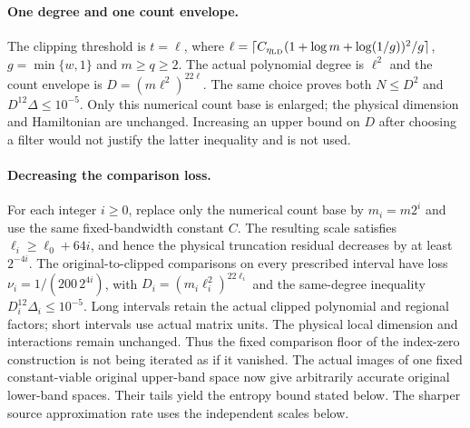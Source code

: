 \documentclass{article}
\begin{document}
\paragraph{One degree and one count envelope.}
The clipping threshold is $t=\ell$, where
$\ell=\lceil C_{\eta_{\rm LD}}(1+\log m+\log(1/g))^2/g\rceil$,
$g=\min\{w,1\}$ and $m\ge q\ge2$.
The actual polynomial degree is $\ell^2$ and the count envelope is
$D=(m\ell^2)^{22\ell}$.
The same choice proves both $N\le D^2$ and $D^{12}\Delta\le10^{-5}$.
Only this numerical count base is enlarged; the physical dimension and
Hamiltonian are unchanged. Increasing an upper bound on $D$ after choosing
a filter would not justify the latter inequality and is not used.

\paragraph{Decreasing the comparison loss.}
For each integer $i\ge0$, replace only the numerical count base by
$m_i=m2^i$ and use the same fixed-bandwidth constant $C$.
The resulting scale satisfies $\ell_i\ge\ell_0+64i$, and hence the
physical truncation residual decreases by at least $2^{-4i}$.
The original-to-clipped comparisons on every prescribed interval have
loss $\nu_i=1/(200\,2^{4i})$, with
$D_i=(m_i\ell_i^2)^{22\ell_i}$ and the same-degree inequality
$D_i^{12}\Delta_i\le10^{-5}$. Long intervals retain the actual clipped
polynomial and regional factors; short intervals use actual matrix units.
The physical local dimension and interactions remain unchanged.
Thus the fixed comparison floor of the index-zero construction is not
being iterated as if it vanished. The actual images of one fixed constant-viable original upper-band
space now give arbitrarily accurate original lower-band spaces.
Their tails yield the entropy bound stated below. The sharper source
approximation rate uses the independent scales below.
\end{document}
